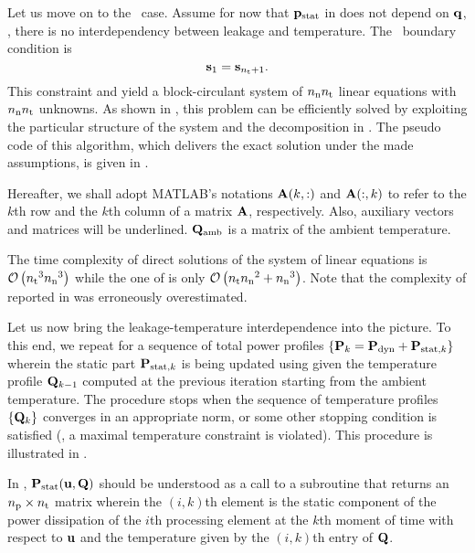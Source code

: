 Let us move on to the \dss\ case.
Assume for now that $\mathbf{p}_{\text{stat}}$ in  does not depend on $\mathbf{q}$, \ie, there is no interdependency between leakage and temperature.
The \dss\ boundary condition is
\[
  \mathbf{s}_1 = \mathbf{s}_{{n_\text{t}} + 1}.
\]
This constraint and  yield a block-circulant system of ${n_\text{n}} {n_\text{t}}$ linear equations with ${n_\text{n}} {n_\text{t}}$ unknowns.
As shown in \cite{ukhov2012}, this problem can be efficiently solved by exploiting the particular structure of the system and the decomposition in .
The pseudo code of this algorithm, which delivers the exact solution under the made assumptions, is given in .


Hereafter, we shall adopt MATLAB's notations $\mathbf{A}(k, :)$ and $\mathbf{A}(:, k)$ to refer to the $k$th row and the $k$th column of a matrix $\mathbf{A}$, respectively.
Also, auxiliary vectors and matrices will be underlined.
$\mathbf{Q}_{\text{amb}}$ is a matrix of the ambient temperature.
\begin{remark}
The time complexity of direct solutions of the system of linear equations is $\mathcal{O}\left( {n_\text{t}}^3 {n_\text{n}}^3 \right)$ while the one of  is only $\mathcal{O}\left( {n_\text{t}} {n_\text{n}}^2 + {n_\text{n}}^3 \right)$.
Note that the complexity of  reported in \cite{ukhov2012} was erroneously overestimated.
\end{remark}

Let us now bring the leakage-temperature interdependence into the picture.
To this end, we repeat  for a sequence of total power profiles $\{ \mathbf{P}_k = \mathbf{P}_{\text{dyn}} + \mathbf{P}_{\text{stat}, k} \}$ wherein the static part $\mathbf{P}_{\text{stat}, k}$ is being updated using  given the temperature profile $\mathbf{Q}_{k - 1}$ computed at the previous iteration starting from the ambient temperature.
The procedure stops when the sequence of temperature profiles $\{ \mathbf{Q}_k \}$ converges in an appropriate norm, or some other stopping condition is satisfied (\eg, a maximal temperature constraint is violated).
This procedure is illustrated in .


In , $\mathbf{P}_{\text{stat}}(\mathbf{u}, \mathbf{Q})$ should be understood as a call to a subroutine that returns an ${n_\text{p}} \times {n_\text{t}}$ matrix wherein the $(i, k)$th element is the static component of the power dissipation of the $i$th processing element at the $k$th moment of time with respect to $\mathbf{u}$ and the temperature given by the $(i, k)$th entry of $\mathbf{Q}$.

